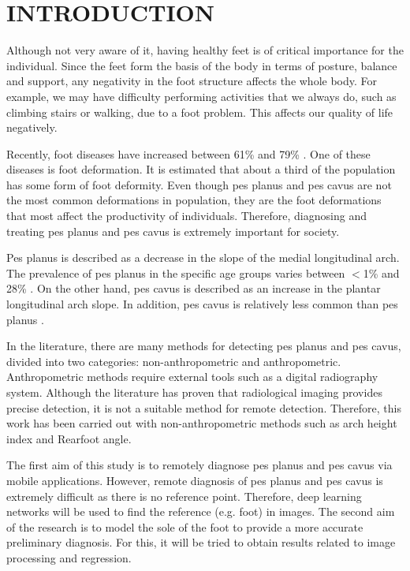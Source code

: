 \chapter{INTRODUCTION}\label{chp:Introduction}

Although not very aware of it, having healthy feet is of critical importance for the individual. Since the feet form the basis of the body in terms of posture, balance and support, any negativity in the foot structure affects the whole body. For example, we may have difficulty performing activities that we always do, such as climbing stairs or walking, due to a foot problem. This affects our quality of life negatively.

Recently, foot diseases have increased between 61\% and 79\% \cite{pita2017flat, menz2010characteristics}. One of these diseases is foot deformation. It is estimated that about a third of the population has some form of foot deformity. Even though pes planus and pes cavus are not the most common deformations in population, they are the foot deformations that most affect the productivity of individuals. Therefore, diagnosing and treating pes planus and pes cavus is extremely important for society. 

Pes planus is described as a decrease in the slope of the medial longitudinal arch. The prevalence of pes planus in the specific age groups varies between $<$1\% and 28\% \cite{ccilli2009prevalence, pfeiffer2006prevalence, abdel2006flat, chen2009flatfoot}. On the other hand, pes cavus is described as an increase in the plantar longitudinal arch slope. In addition, pes cavus is relatively less common than pes planus \cite{kharbuja2017prevalence}. 

In the literature, there are many methods for detecting pes planus and pes cavus, divided into two categories: non-anthropometric and anthropometric. Anthropometric methods require external tools such as a digital radiography system. Although the literature has proven that radiological imaging provides precise detection, it is not a suitable method for remote detection. Therefore, this work has been carried out with non-anthropometric methods such as arch height index and Rearfoot angle.

The first aim of this study is to remotely diagnose pes planus and pes cavus via mobile applications. However, remote diagnosis of pes planus and pes cavus is extremely difficult as there is no reference point. Therefore, deep learning networks will be used to find the reference (e.g. foot) in images. The second aim of the research is to model the sole of the foot to provide a more accurate preliminary diagnosis. For this, it will be tried to obtain results related to image processing and regression.

